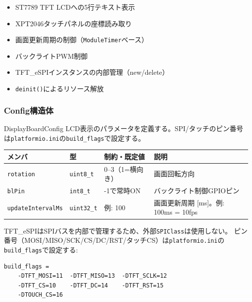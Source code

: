 \begin{itemize}
    \item ST7789 TFT LCDへの5行テキスト表示
    \item XPT2046タッチパネルの座標読み取り
    \item 画面更新周期の制御（\texttt{ModuleTimer}ベース）
    \item バックライトPWM制御
    \item TFT\_eSPIインスタンスの内部管理（new/delete）
    \item \texttt{deinit()}によるリソース解放
\end{itemize}

\subsubsection{Config構造体}

\begin{funcblock}{DisplayBoardConfig}
LCD表示のパラメータを定義する。SPI/タッチのピン番号は\texttt{platformio.ini}の\texttt{build\_flags}で設定する。

\begin{longtable}{l l l p{4.5cm}}
\toprule
\textbf{メンバ} & \textbf{型} & \textbf{制約・既定値} & \textbf{説明} \\
\midrule
\endhead
\texttt{rotation}        & \texttt{uint8\_t}  & 0--3（1=横向き） & 画面回転方向 \\
\texttt{blPin}           & \texttt{int8\_t}   & -1で常時ON       & バックライト制御GPIOピン \\
\texttt{updateIntervalMs} & \texttt{uint32\_t} & 例: 100         & 画面更新周期 [ms]。例: 100ms = 10fps \\
\bottomrule
\end{longtable}
\end{funcblock}

\begin{notebox}
TFT\_eSPIはSPIバスを内部で管理するため、外部\texttt{SPIClass}は使用しない。
ピン番号（MOSI/MISO/SCK/CS/DC/RST/タッチCS）は\texttt{platformio.ini}の\texttt{build\_flags}で設定する:
\begin{lstlisting}[style=cppstyle, numbers=none, frame=none, backgroundcolor=\color{white}]
build_flags =
    -DTFT_MOSI=11  -DTFT_MISO=13  -DTFT_SCLK=12
    -DTFT_CS=10    -DTFT_DC=14    -DTFT_RST=15
    -DTOUCH_CS=16
\end{lstlisting}
\end{notebox}

